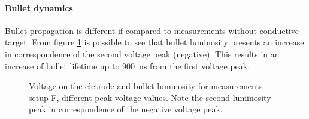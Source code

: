\paragraph{Bullet dynamics}
Bullet propagation is different if compared to measurements without conductive target. From figure \ref{fig:elio_a_Im} is possible to see that bullet luminosity presents an increase in correspondence of the second voltage peak (negative). This results in an increase of bullet lifetime up to \SI{900}{\nano\second} from the first voltage peak.
\begin{figure}
 \centering
 \hfill
 \caption{Voltage on the elctrode and bullet luminosity for measurements setup F, different peak voltage values. Note the second luminosity peak in correspondence of the negative voltage peak.}
 \label{fig:elio_a_Im}
\end{figure}

